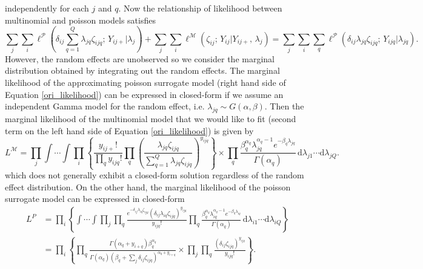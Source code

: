 \documentclass[]{article}
\theoremstyle{definition}
\begin{document}
independently for each $j$ and $q$. Now the relationship of likelihood between multinomial and poisson models satisfies 
\begin{equation}\label{ori_likelihood}
    \sum_{j} \sum_{i} \ell^{\mathcal{P}} \left( \delta_{ij} \sum_{q=1}^{Q} \lambda_{jq} \zeta_{ijq};\, Y_{ij+} \Big| \lambda_j \right) + \sum_{j} \sum_{i} \ell^{\mathcal{M}} \left( \zeta_{ij};\, Y_{ij} \Big| Y_{ij+},\, \lambda_j \right) = \sum_{j} \sum_{i} \sum_{q} \ell^{\mathcal{P}} \left( \delta_{ij} \lambda_{jq} \zeta_{ijq};\, Y_{ijq} \Big| \lambda_{jq} \right).
\end{equation}
	However, the random effects are unobserved so we consider the marginal distribution obtained by integrating out the random effects. The marginal likelihood of the approximating poisson surrogate model (right hand side of Equation \ref{ori_likelihood}) can be expressed in closed-form if we assume an independent Gamma model for the random effect, i.e. $\lambda_{jq}\sim G(\alpha, \beta)$. Then the marginal likelihood of the multinomial model that we would like to fit (second term on the left hand side of Equation \ref{ori_likelihood}) is given by
\begin{equation}
    L^{\mathcal{M}} = \prod_{j} \int \cdots \int \prod_{i} \left\{ \frac{y_{ij+}!}{\prod_{q} y_{ijq}!} \prod_{q} \left( \frac{\lambda_{jq} \zeta_{ijq}}{\sum_{q=1}^{Q} \lambda_{jq} \zeta_{ijq}} \right)^{y_{ijq}} \right\} \times \prod_{q} \frac{\beta_{q}^{\alpha_q} \lambda_{jq}^{\alpha_q - 1} e^{-\beta_q \lambda_{jq}}}{\Gamma(\alpha_q)} \, \mathrm{d}\lambda_{j1} \cdots \mathrm{d}\lambda_{jQ}.
\end{equation}
which does not generally exhibit a closed-form solution regardless of the random effect distribution. On the other hand, the marginal likelihood of the poisson surrogate model can be expressed in closed-form
\begin{align}
    L^{P} &= \prod_{i} \left\{ \int \cdots \int \prod_{j} \prod_{q} \frac{e^{-\delta_{ij} \lambda_{iq} \zeta_{ijq}} (\delta_{ij} \lambda_{iq} \zeta_{ijq})^{y_{ijq}}}{y_{ijq}!} \prod_{q} \frac{\beta_{q}^{\alpha_q} \lambda_{iq}^{\alpha_q - 1} e^{-\beta_q \lambda_{iq}}}{\Gamma(\alpha_q)} \, \mathrm{d}\lambda_{i1} \cdots \mathrm{d}\lambda_{iQ} \right\} \nonumber \\
    &= \prod_{i} \left\{ \prod_{q} \frac{\Gamma(\alpha_q + y_{i+q}) \beta_{q}^{\alpha_q}}{\Gamma(\alpha_q)(\beta_q + \sum_{j} \delta_{ij} \zeta_{ijq})^{\alpha_q + y_{i+q}}} \times \prod_{j} \prod_{q} \frac{(\delta_{ij} \zeta_{ijq})^{y_{ijq}}}{y_{ijq}!} \right\}.
\end{align}
\end{document}
